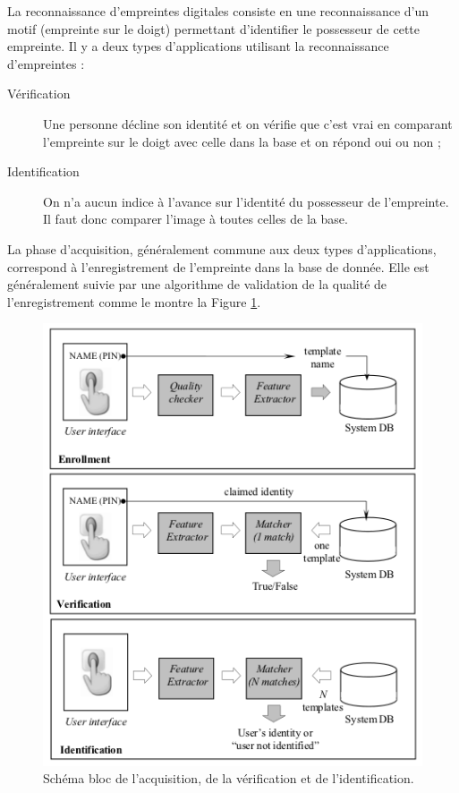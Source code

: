 La reconnaissance d'empreintes digitales consiste en une
reconnaissance d'un motif (empreinte sur le doigt) permettant
d'identifier le possesseur de cette empreinte. Il y a deux types
d'applications utilisant la reconnaissance d'empreintes :

\begin{description}
\item[Vérification] Une personne décline son identité et on vérifie
  que c'est vrai en comparant l'empreinte sur le doigt avec celle dans
  la base et on répond oui ou non ;
\item[Identification] On n'a aucun indice à l'avance sur l'identité du
  possesseur de l'empreinte. Il faut donc comparer l'image à toutes
  celles de la base.
\end{description}

La phase d'acquisition, généralement commune aux deux types
d'applications, correspond à l'enregistrement de l'empreinte dans la
base de donnée. Elle est généralement suivie par une algorithme de
validation de la qualité de l'enregistrement comme le montre la Figure
\ref{fig:schema-bloc-acq}.

\begin{figure}[H]
\centering
\includegraphics[scale=0.8]{three_way.png}
\caption{Schéma bloc de l'acquisition, de la vérification et de
  l'identification.}
\label{fig:schema-bloc-acq}
\end{figure}


